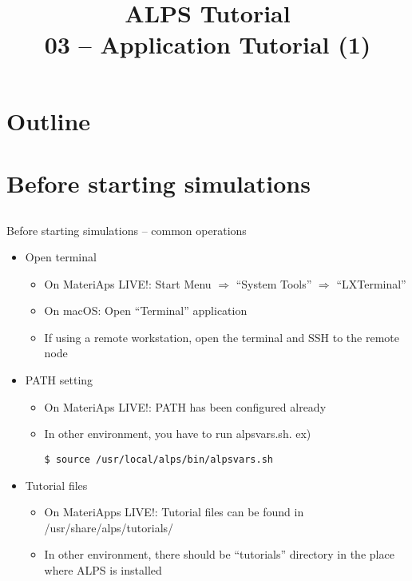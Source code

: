 
\title{ALPS Tutorial \\ 03 -- Application Tutorial (1)}




\begin{frame}
  \titlepage
\end{frame}

\section*{Outline}
\begin{frame}[t,fragile]
   \tableofcontents
\end{frame}

\section{Before starting simulations}

\subsection*{\redb\whiteb\greenm}
\begin{frame}[t,fragile]{Before starting simulations -- common operations}
  \begin{itemize}
  \item Open terminal
    \begin{itemize}
    \item \alert{On MateriAps LIVE!: Start Menu $\Rightarrow$ ``System Tools'' $\Rightarrow$ ``LXTerminal''}
    \item On macOS: Open ``Terminal'' application
    \item If using a remote workstation, open the terminal and SSH to the remote node
    \end{itemize}

  \item PATH setting
    \begin{itemize}
    \item \alert{On MateriAps LIVE!: PATH has been configured already}
    \item In other environment, you have to run alpsvars.sh. ex)
\begin{lstlisting}
$ source /usr/local/alps/bin/alpsvars.sh
\end{lstlisting}
    \end{itemize}
    
  \item Tutorial files
    \begin{itemize}
    \item \alert{On MateriApps LIVE!: Tutorial files can be found in /usr/share/alps/tutorials/}
    \item In other environment, there should be ``tutorials'' directory in the place where ALPS is installed
    \end{itemize}
  \end{itemize}
\end{frame}

